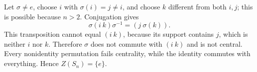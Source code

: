 Let $\sigma\ne e$, choose $i$ with $\sigma(i)=j\ne i$, and choose $k$ different from both $i,j$; this is possible because $n>2$.
Conjugation gives
\[
\sigma(i\ k)\sigma^{-1}=(j\ \sigma(k)).
\]
This transposition cannot equal $(i\ k)$, because its support contains $j$, which is neither $i$ nor $k$. Therefore $\sigma$ does not commute with $(i\ k)$ and is not central. Every nonidentity permutation fails centrality, while the identity commutes with everything. Hence $Z(S_n)=\{e\}$.
